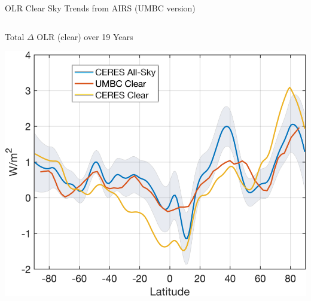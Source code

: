 \documentclass[10pt,t]{beamer}
\begin{document}
\begin{frame}{OLR Clear Sky Trends from AIRS (UMBC version)}
\vspace{-0.1in}

\begin{columns}
\begin{column}{0.5\columnwidth}
\begin{block}{\small Total \(\Delta\) OLR (clear) over 19 Years}
\vspace{-0.1in}
\begin{center}
\includegraphics[width=\linewidth]{SunClimate2022/ceres_clear_and_cld_19yrold_vs_umbc.png}
\end{center}
\end{block}
\end{column}


\end{columns}
\end{frame}
\end{document}
